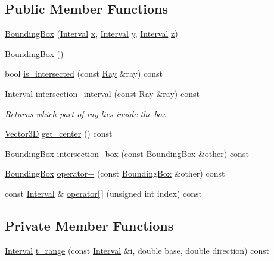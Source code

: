 \subsection*{Public Member Functions}
\begin{DoxyCompactItemize}
\item 
\hyperlink{classBoundingBox_a4120184a9340ea9a0c43285c9d0f18bf}{Bounding\+Box} (\hyperlink{classInterval}{Interval} \hyperlink{classBoundingBox_a93ea5f12ef2300fe61925f6b44faaebe}{x}, \hyperlink{classInterval}{Interval} \hyperlink{classBoundingBox_a593fd6b66d3ed0352d92024685863090}{y}, \hyperlink{classInterval}{Interval} \hyperlink{classBoundingBox_a9a6005ebe3550447aad804123fa68fea}{z})
\item 
\hyperlink{classBoundingBox_a6e401c4da5839950f1f30c8b8c4d1208}{Bounding\+Box} ()
\item 
bool \hyperlink{classBoundingBox_a8f8eca09001b89f0c80566731fb3ef99}{is\+\_\+intersected} (const \hyperlink{classRay}{Ray} \&ray) const 
\item 
\hyperlink{classInterval}{Interval} \hyperlink{classBoundingBox_a23a907bb7dfdcd0bd60a9e1cd59bda35}{intersection\+\_\+interval} (const \hyperlink{classRay}{Ray} \&ray) const 
\begin{DoxyCompactList}\small\item\em Returns which part of ray lies inside the box. \end{DoxyCompactList}\item 
\hyperlink{classVector3D}{Vector3D} \hyperlink{classBoundingBox_aee02002578e3f3a0d1046f1c6da86d7b}{get\+\_\+center} () const 
\item 
\hyperlink{classBoundingBox}{Bounding\+Box} \hyperlink{classBoundingBox_ae8c481a0410806867b8e7fce7b95eee2}{intersection\+\_\+box} (const \hyperlink{classBoundingBox}{Bounding\+Box} \&other) const 
\item 
\hyperlink{classBoundingBox}{Bounding\+Box} \hyperlink{classBoundingBox_a58ea4f5a93b79953b5f971a7e1cb2e9c}{operator+} (const \hyperlink{classBoundingBox}{Bounding\+Box} \&other) const 
\item 
const \hyperlink{classInterval}{Interval} \& \hyperlink{classBoundingBox_a3db32eae066cb2af88dbe9394b58db9f}{operator\mbox{[}$\,$\mbox{]}} (unsigned int index) const 
\end{DoxyCompactItemize}
\subsection*{Private Member Functions}
\begin{DoxyCompactItemize}
\item 
\hyperlink{classInterval}{Interval} \hyperlink{classBoundingBox_a708734f01854529bbdb0c3b2a33461d5}{t\+\_\+range} (const \hyperlink{classInterval}{Interval} \&i, double base, double direction) const 
\end{DoxyCompactItemize}
